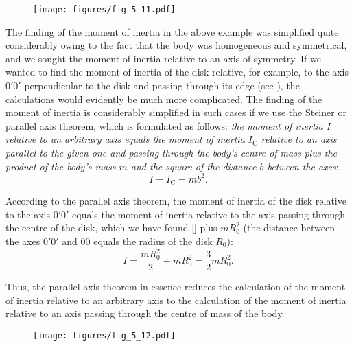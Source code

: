 \begin{figure}[t]
	\begin{center}
		\texttt{[image: figures/fig\_5\_11.pdf]}
		\caption[]{}
		\label{fig:5_11}
	\end{center}
\vspace{-1.0cm}
\end{figure}

The finding of the moment of inertia in the above example was simplified quite considerably owing to the fact that the body was homogeneous and symmetrical, and we sought the moment of inertia relative to an axis of symmetry. If we wanted to find the moment of inertia of the disk relative, for example, to the axis $0'0'$ perpendicular to the disk and passing through its edge (see ), the calculations would evidently be much more complicated. The finding of the moment of inertia is considerably simplified in such cases if we use the Steiner or parallel axis theorem, which is formulated as follows: \textit{the moment of inertia $I$ relative to an arbitrary axis equals the moment of inertia $I_{\text{C}}$ relative to an axis parallel to the given one and passing through the body's centre of mass plus the product of the body's mass $m$ and the square of the distance $b$ between the axes}:
\begin{equation}\label{eq:5_23}
I = I_{\text{C}}= mb^2.
\end{equation}

According to the parallel axis theorem, the moment of inertia of the disk relative to the axis $0'0'$ equals the moment of inertia relative to the axis passing through the centre of the disk, which we have found [] plus $mR_0^2$ (the distance between the axes $0'0'$ and $00$ equals the radius of the disk $R_0$):
\begin{equation*}
I = \frac{mR^2_0}{2} + mR_0^2 = \frac{3}{2}mR_0^2.
\end{equation*}

Thus, the parallel axis theorem in essence reduces the calculation of the moment of inertia relative to an arbitrary axis to the calculation of the moment of inertia relative to an axis passing through the centre of mass of the body.

\begin{figure}[t]
	\begin{center}
		\texttt{[image: figures/fig\_5\_12.pdf]}
		\caption[]{}
		\label{fig:5_12}
	\end{center}
\vspace{-1.0cm}
\end{figure}

